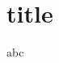 \documentclass[xcolor={dvipsnames},noamsthm,hyperref={hypertexnames=false}]{beamer}
\begin{document}
\section{title} 

\begin{frame}
    abc
\end{frame} 
\end{document}
